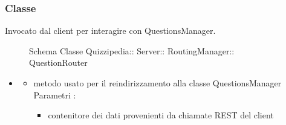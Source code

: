 \subsubsection{Classe }
Invocato dal client per interagire con QuestionsManager.
\begin{figure}[H]
\centering
\noindent{}
\caption[Schema Classe QuestionRouter]{Schema Classe Quizzipedia:: Server:: RoutingManager:: QuestionRouter}
\end{figure}
\begin{itemize}
\item {}
\begin{itemize}
\item {}
\newline
metodo usato per il reindirizzamento alla classe QuestionsManager
\newline
Parametri :
\begin{itemize}
\item {}
\newline
contenitore dei dati provenienti da chiamate REST del client
\end{itemize}
\end{itemize}
\end{itemize}
